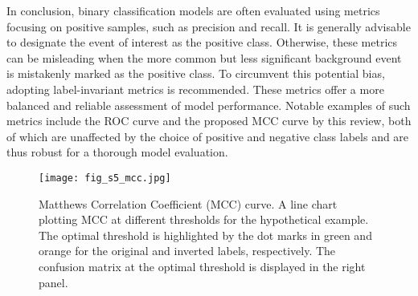 In conclusion, binary classification models are often evaluated using metrics focusing on positive samples, such as precision and recall. It is generally advisable to designate the event of interest as the positive class. Otherwise, these metrics can be misleading when the more common but less significant background event is mistakenly marked as the positive class. To circumvent this potential bias, adopting label-invariant metrics is recommended. These metrics offer a more balanced and reliable assessment of model performance. Notable examples of such metrics include the ROC curve and the proposed MCC curve by this review, both of which are unaffected by the choice of positive and negative class labels and are thus robust for a thorough model evaluation.
\begin{figure}[h]
    \centering
    \texttt{[image: fig\_s5\_mcc.jpg]}
    \caption{Matthews Correlation Coefficient (MCC) curve. A line chart plotting MCC at different thresholds for the hypothetical example. The optimal threshold is highlighted by the dot marks in green and orange for the original and inverted labels, respectively. The confusion matrix at the optimal threshold is displayed in the right panel.}
    \label{fig:s5_mcc}
\end{figure}